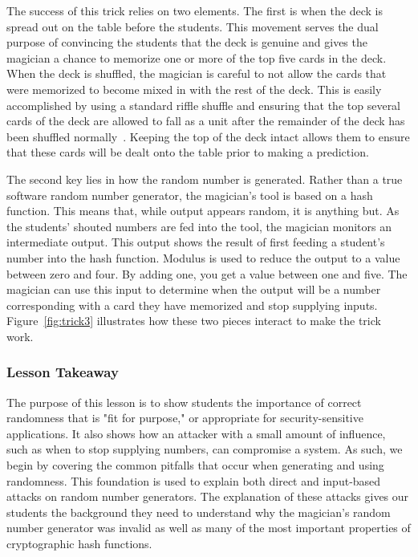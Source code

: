 The success of this trick relies on two elements.
The first is when the deck is spread out on the
table before the students.  This movement serves the dual purpose of convincing
the students that the deck is genuine and gives the magician a chance to
memorize one or more of the top five cards in the deck.
When the deck is
shuffled, the magician is careful to not allow the cards that were memorized to
become mixed in with the rest of the deck.  This is easily accomplished by
using a standard riffle shuffle and ensuring that the top several cards of
the deck are allowed to fall as a unit after the remainder of the deck has
been shuffled normally~\cite{wikishuffle}.
Keeping the top of the deck intact allows them to ensure that
these cards will be dealt onto the table prior to making a prediction.


The second key lies in how the random number is generated.
Rather than
a true software random number generator, the magician's tool is based on a hash
function.  This means that, while output appears random, it is anything but.
As the students' shouted numbers are fed into the tool, the magician monitors an
intermediate output.
This output shows the result of first feeding a student's number
into the hash function. Modulus is used to reduce the output to a value
between zero and four. By adding one, you  get a value between
one and five.
The magician can use this input to determine when the output will be a number
corresponding with a card they have memorized and stop supplying inputs.
Figure~\ref{fig:trick3} illustrates how these two pieces interact to make
the trick work.


%

\subsubsection{Lesson Takeaway}

The purpose of this lesson is to show students the importance of correct
randomness
that is "fit for purpose," or appropriate for security-sensitive applications.
It also shows how an attacker
with a small amount of influence,
such as when to stop supplying numbers,
can compromise a
system.
As such, we begin by covering the common pitfalls
that occur when generating and
using randomness.
This foundation is used to explain both
direct and input-based attacks on random
number generators.
The explanation of these attacks gives our students the background they need to
understand why the magician's random number generator was invalid as well as
many of the most important properties of cryptographic hash functions.

